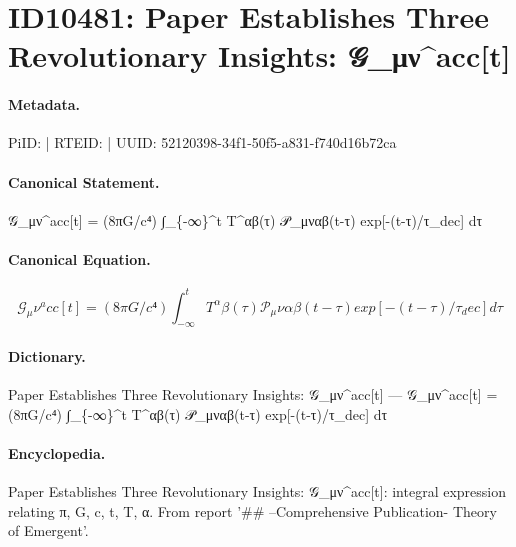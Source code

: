 \section*{ID10481: Paper Establishes Three Revolutionary Insights: 𝒢\_μν\textasciicircum{}acc[t]}
\paragraph{Metadata.}
PiID:  | RTEID:  | UUID: 52120398-34f1-50f5-a831-f740d16b72ca

\paragraph{Canonical Statement.}
𝒢\_μν\textasciicircum{}acc[t] = (8πG/c⁴) ∫\_\{-∞\}\textasciicircum{}t T\textasciicircum{}αβ(τ) 𝒫\_μναβ(t-τ) exp[-(t-τ)/τ\_dec] dτ

\paragraph{Canonical Equation.}
\[
𝒢_μν^acc[t] = (8πG/c⁴) ∫_{-∞}^t T^αβ(τ) 𝒫_μναβ(t-τ) exp[-(t-τ)/τ_dec] dτ
\]

\paragraph{Dictionary.}
Paper Establishes Three Revolutionary Insights: 𝒢\_μν\textasciicircum{}acc[t] — 𝒢\_μν\textasciicircum{}acc[t] = (8πG/c⁴) ∫\_\{-∞\}\textasciicircum{}t T\textasciicircum{}αβ(τ) 𝒫\_μναβ(t-τ) exp[-(t-τ)/τ\_dec] dτ

\paragraph{Encyclopedia.}
Paper Establishes Three Revolutionary Insights: 𝒢\_μν\textasciicircum{}acc[t]: integral expression relating π, G, c, t, T, α. From report '\#\# --Comprehensive Publication- Theory of Emergent'.
